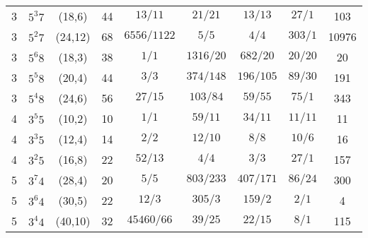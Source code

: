 \documentclass{beamer}
\begin{document}
\begin{frame}
\begin{center}
\begin{tabular}{||c|c|c|c|c|c|c|c|c||}
3 & $5^{3}7$ & (18,6) & 44 & $13/11$ & $21/21$ & $13/13$ & $27/1$ & 103\\
3 & $5^{2}7$ & (24,12) & 68 & $6556/1122$ & $5/5$ & $4/4$ & $303/1$ & 10976\\\hline
3 & $5^{6}8$ & (18,3) & 38 & $1/1$ & $1316/20$ & $682/20$ & $20/20$ & 20\\
3 & $5^{5}8$ & (20,4) & 44 & $3/3$ & $374/148$ & $196/105$ & $89/30$ & 191\\
3 & $5^{4}8$ & (24,6) & 56 & $27/15$ & $103/84$ & $59/55$ & $75/1$ & 343\\
\hline \hline
4 & $3^{5}5$ & (10,2) & 10 & $1/1$ & $59/11$ & $34/11$ & $11/11$ & 11\\
4 & $3^{3}5$ & (12,4) & 14 & $2/2$ & $12/10$ & $8/8$ & $10/6$ & 16\\
4 & $3^{2}5$ & (16,8) & 22 & $52/13$ & $4/4$ & $3/3$ & $27/1$ & 157\\
\hline \hline
5 & $3^{7}4$ & (28,4) & 20 & $5/5$ & $803/233$ & $407/171$ & $86/24$ & 300\\
5 & $3^{6}4$ & (30,5) & 22 & $12/3$ & $305/3$ & $159/2$ & $2/1$ & 4\\
5 & $3^{4}4$ & (40,10) & 32 & $45460/66$ & $39/25$ & $22/15$ & $8/1$ & 115\\
\hline \hline
\end{tabular}
\end{center}

\end{frame}
\end{document}
